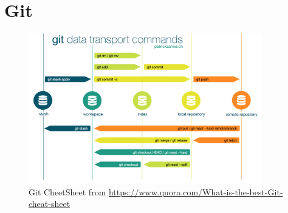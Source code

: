 \section{Git}

\begin{figure}[ht]
  \begin{center}
  \includegraphics[keepaspectratio,width=0.9\textwidth]{Pictures/git-cheatsheet1.png}
  \caption{Git CheetSheet from
    \url{https://www.quora.com/What-is-the-best-Git-cheat-sheet}}
  \label{fig:HardwareStructure}
  \end{center}
\end{figure}


